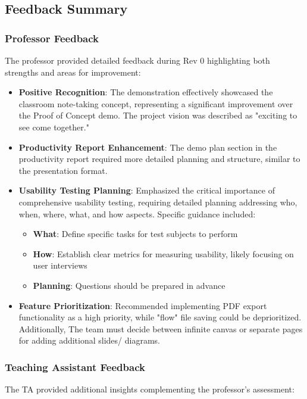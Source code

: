 \documentclass[12pt, titlepage]{article}
\begin{document}
\subsection{Feedback Summary}

\subsubsection{Professor Feedback}
The professor provided detailed feedback during Rev 0 highlighting both strengths
and areas for improvement:

\begin{itemize}
\item \textbf{Positive Recognition}: The demonstration effectively
  showcased the classroom note-taking concept, representing a
  significant improvement over the Proof of Concept demo. The project
  vision was described as "exciting to see come together."

\item \textbf{Productivity Report Enhancement}: The demo plan section
  in the productivity report required more detailed planning and
  structure, similar to the presentation format.

\item \textbf{Usability Testing Planning}: Emphasized the critical
  importance of comprehensive usability testing, requiring detailed
  planning addressing who, when, where, what, and how aspects. Specific
  guidance included:
  \begin{itemize}
  \item \textbf{What}: Define specific tasks for test subjects to
    perform
  \item \textbf{How}: Establish clear metrics for measuring usability,
    likely focusing on user interviews
  \item \textbf{Planning}: Questions should be prepared in advance
  \end{itemize}

\item \textbf{Feature Prioritization}: Recommended implementing PDF
  export functionality as a high priority, while "flow" file saving
  could be deprioritized. Additionally, The team must decide between
  infinite canvas or separate pages for adding additional slides/
  diagrams.
\end{itemize}

\subsubsection{Teaching Assistant Feedback}
The TA provided additional insights complementing the professor's
assessment:
\end{document}
